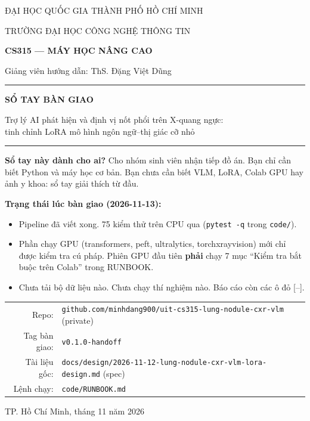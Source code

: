 \documentclass[11pt,a4paper]{article}
\newcommand{\code}[1]{\texttt{#1}}
\begin{document}
\begin{titlepage}
\centering
{\small ĐẠI HỌC QUỐC GIA THÀNH PHỐ HỒ CHÍ MINH\par}
{\small TRƯỜNG ĐẠI HỌC CÔNG NGHỆ THÔNG TIN\par}
\vspace{1.2cm}
{\large\bfseries CS315 --- MÁY HỌC NÂNG CAO\par}
{\normalsize Giảng viên hướng dẫn: ThS. Đặng Việt Dũng\par}
\vspace{0.8cm}
\rule{\textwidth}{0.8pt}\par\vspace{0.5cm}
{\LARGE\bfseries SỔ TAY BÀN GIAO\par}
\vspace{0.3cm}
{\large Trợ lý AI phát hiện và định vị nốt phổi trên X-quang ngực:\\
tinh chỉnh LoRA mô hình ngôn ngữ--thị giác cỡ nhỏ\par}
\vspace{0.3cm}
\rule{\textwidth}{0.8pt}\par
\vspace{1.0cm}
\begin{keybox}[width=0.86\textwidth]
\small
\textbf{Sổ tay này dành cho ai?} Cho nhóm sinh viên nhận tiếp đồ án. Bạn chỉ cần biết Python và
máy học cơ bản. Bạn chưa cần biết VLM, LoRA, Colab GPU hay ảnh y khoa: sổ tay giải thích từ đầu.

\medskip
\textbf{Trạng thái lúc bàn giao (2026-11-13):}
\begin{itemize}[leftmargin=1.2em]
\item Pipeline đã viết xong. 75 kiểm thử trên CPU qua (\code{pytest -q} trong \code{code/}).
\item Phần chạy GPU (transformers, peft, ultralytics, torchxrayvision) mới chỉ được kiểm tra cú pháp.
      Phiên GPU đầu tiên \textbf{phải} chạy 7 mục ``Kiểm tra bắt buộc trên Colab'' trong RUNBOOK.
\item Chưa tải bộ dữ liệu nào. Chưa chạy thí nghiệm nào. Báo cáo còn các ô đỏ \textcolor{badred}{[--]}.
\end{itemize}
\end{keybox}
\vspace{0.6cm}
\begin{tabular}{r l}
Repo: & \code{github.com/minhdang900/uit-cs315-lung-nodule-cxr-vlm} (private)\\
Tag bàn giao: & \code{v0.1.0-handoff}\\
Tài liệu gốc: & \code{docs/design/2026-11-12-lung-nodule-cxr-vlm-lora-design.md} (spec)\\
Lệnh chạy: & \code{code/RUNBOOK.md}\\
\end{tabular}
\vfill
{\small TP. Hồ Chí Minh, tháng 11 năm 2026\par}
\end{titlepage}

\tableofcontents
\clearpage










\appendix

\end{document}
